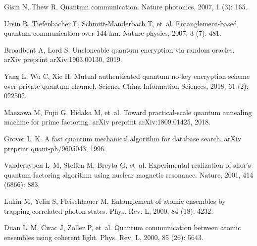 \begin{thebibliography}{113}
    Gisin N, Thew R.
	\newblock Quantum communication\allowbreak[J].
	\newblock Nature photonics, 2007, 1 (3): 165.
	
	Ursin R, Tiefenbacher F, Schmitt-Manderbach T, et~al.
	\newblock Entanglement-based quantum communication over 144 km\allowbreak[J].
	\newblock Nature physics, 2007, 3 (7): 481.
	
	Broadbent A, Lord S.
	\newblock Uncloneable quantum encryption via random oracles\allowbreak[J].
	\newblock arXiv preprint arXiv:1903.00130, 2019.
	
	Yang L, Wu C, Xie H.
	\newblock Mutual authenticated quantum no-key encryption scheme over private
	quantum channel\allowbreak[J].
	\newblock Science China Information Sciences, 2018, 61 (2): 022502.
	
	Maezawa M, Fujii G, Hidaka M, et~al.
	\newblock Toward practical-scale quantum annealing machine for prime
	factoring\allowbreak[J].
	\newblock arXiv preprint arXiv:1809.01425, 2018.
	
	Grover L~K.
	\newblock A fast quantum mechanical algorithm for database
	search\allowbreak[J].
	\newblock arXiv preprint quant-ph/9605043, 1996.
	
	Vandersypen L~M, Steffen M, Breyta G, et~al.
	\newblock Experimental realization of shor's quantum factoring algorithm using
	nuclear magnetic resonance\allowbreak[J].
	\newblock Nature, 2001, 414 (6866): 883.
	
	Lukin M, Yelin S, Fleischhauer M.
	\newblock Entanglement of atomic ensembles by trapping correlated photon
	states\allowbreak[J].
	\newblock Phys. Rev. L, 2000, 84 (18): 4232.
	
	Duan L~M, Cirac J, Zoller P, et~al.
	\newblock Quantum communication between atomic ensembles using coherent
	light\allowbreak[J].
	\newblock Phys. Rev. L, 2000, 85 (26): 5643.
	

\end{thebibliography}
